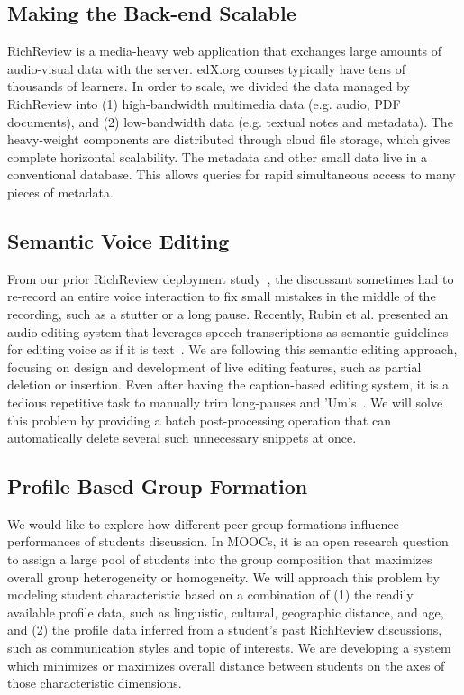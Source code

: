 \documentclass{sigchi}
\begin{document}
\subsection{Making the Back-end Scalable}
RichReview is a media-heavy web application that exchanges large amounts of audio-visual data with the server. edX.org courses typically have tens of thousands of learners.
In order to scale, we divided the data managed by RichReview into (1) high-bandwidth multimedia data (e.g. audio, PDF documents), and (2) low-bandwidth data (e.g. textual notes and metadata).
The heavy-weight components are distributed through cloud file storage, which gives complete horizontal scalability. The metadata and other small data live in a conventional database. This allows queries for rapid simultaneous access to many pieces of metadata.

\subsection{Semantic Voice Editing}
From our prior RichReview deployment study~\cite{yoon2015richreview}, the discussant sometimes had to re-record an entire voice interaction to fix small mistakes in the middle of the recording, such as a stutter or a long pause.
Recently, Rubin et al. presented an audio editing system that leverages speech transcriptions as semantic guidelines for editing voice as if it is text~\cite{rubin2013content}.
We are following this semantic editing approach, focusing on design and development of live editing features, such as partial deletion or insertion.
Even after having the caption-based editing system, it is a tedious repetitive task to manually trim long-pauses and 'Um's~\cite{yoon2014richreview}.
We will solve this problem by providing a batch post-processing operation that can automatically delete several such unnecessary snippets at once.

\subsection{Profile Based Group Formation}
We would like to explore how different peer group formations influence performances of students discussion. 
In MOOCs, it is an open research question to assign a large pool of students into the group composition that maximizes overall group heterogeneity or homogeneity.
We will approach this problem by modeling student characteristic based on a combination of (1) the readily available profile data, such as linguistic, cultural, geographic distance, and age, and (2) the profile data inferred from a student's past RichReview discussions, such as communication styles and topic of interests.
We are developing a system which minimizes or maximizes overall distance between students on the axes of those characteristic dimensions.
\end{document}
